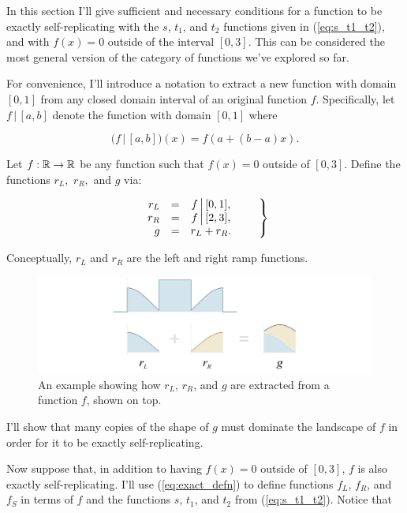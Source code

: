 \documentclass[20pt,]{extarticle}
\begin{document}
In this section I'll give sufficient and necessary conditions for a
function to be exactly self-replicating with the \(s\), \(t_1\), and
\(t_2\) functions given in (\ref{eq:s_t1_t2}), and with \(f(x)=0\)
outside of the interval \([0, 3]\). This can be considered the most
general version of the category of functions we've explored so far.

\newcommand{\restrict}{\,\big|\,}

For convenience, I'll introduce a notation to extract a new function
with domain \([0, 1]\) from any closed domain interval of an original
function \(f\). Specifically, let \(f \restrict [a, b]\) denote the
function with domain \([0,1]\) where

\[
\big(f \restrict [a,b]\big)(x) = f(a + (b-a)x).
\]

Let \(f:\mathbb{R}\to\mathbb{R}\) be any function such that \(f(x)=0\) outside of
\([0, 3]\). Define the functions \(r_L,\) \(r_R,\) and \(g\) via:

\begin{equation}\eqnset{\begin{array}{rlc}
r_L & = & f\restrict [0, 1], \\
r_R & = & f\restrict [2, 3], \\
g   & = & r_L + r_R.
\end{array}}\label{eq:rL_rR_g}\end{equation}

Conceptually, \(r_L\) and \(r_R\) are the left and right ramp functions.

\begin{figure}
\centering
\includegraphics{images/nonpl_setup.png}
\caption{An example showing how \(r_L\), \(r_R\), and \(g\) are
extracted from a function \(f\), shown on top.}\label{fig:nonpl_setup}
\end{figure}

I'll show that many copies of the shape of \(g\) must dominate the
landscape of \(f\) in order for it to be exactly self-replicating.

Now suppose that, in addition to having \(f(x)=0\) outside of \([0,3]\),
\(f\) is also exactly self-replicating. I'll use (\ref{eq:exact_defn})
to define functions \(f_L\), \(f_R\), and \(f_S\) in terms of \(f\) and
the functions \(s\), \(t_1\), and \(t_2\) from (\ref{eq:s_t1_t2}).
Notice that
\end{document}
